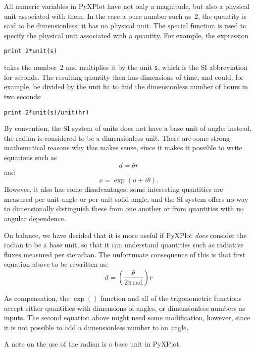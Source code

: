All numeric variables in PyXPlot have not only a magnitude, but also a
physical unit associated with them. In the case a pure number such as~2, the
quantity is said to be dimensionless: it has no physical unit. The special
function  is used to specify the physical unit associated with a
quantity. For example, the expression

\begin{verbatim}
print 2*unit(s)
\end{verbatim}

\noindent takes the number~2 and multiplies it by the unit {\tt s}, which is
the SI abbreviation for seconds.  The resulting quantity then has dimensions of
time, and could, for example, be divided by the unit {\tt hr} to find the
dimensionless number of hours in two seconds:

\begin{verbatim}
print 2*unit(s)/unit(hr)
\end{verbatim}

\begin{boxout}
By convention, the SI system of units does not have a base unit of angle:
instead, the radian is considered to be a dimensionless unit.  There are some
strong mathematical reasons why this makes sense, since it makes it possible to
write equations such as
\begin{displaymath}
d=\theta r
\end{displaymath}
and
\begin{displaymath}
x = \exp(a+i\theta).
\end{displaymath}
However, it also has some disadvantages: some interesting quantities are
measured per unit angle or per unit solid angle, and the SI system offers no
way to dimensionally distinguish these from one another or from quantities with
no angular dependence.

On balance, we have decided that it is more useful if PyXPlot {\it does}
consider the radian to be a base unit, so that it can understand quantities
such as radiative fluxes measured per steradian. The unfortunate consequence of
this is that first equation above to be rewritten as:
\begin{displaymath}
d=\left(\frac{\theta}{2\pi\,\mathrm{rad}}\right) r
\end{displaymath}

As compensation, the $\exp()$ function and all of the trigonometric functions
accept either quantities with dimensions of angles, or dimensionless numbers as
inputs. The second equation above might need some modification, however, since
it is not possible to add a dimensionless number to an angle.
\caption{A note on the use of the radian is a base unit in PyXPlot.}
\end{boxout}

